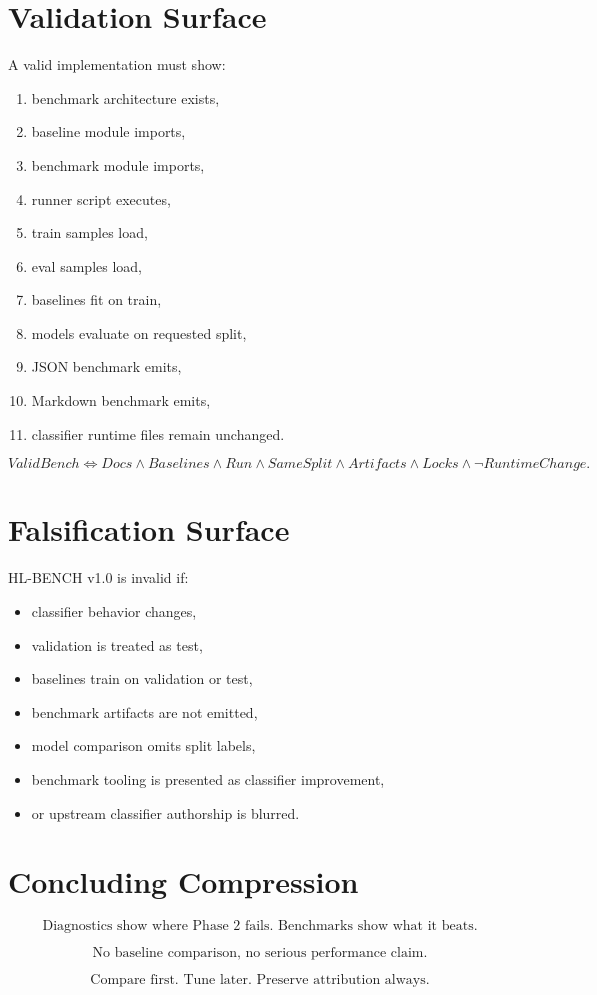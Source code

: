 \documentclass[12pt]{article}
\begin{document}
\section{Validation Surface}

A valid implementation must show:

\begin{enumerate}
\item benchmark architecture exists,
\item baseline module imports,
\item benchmark module imports,
\item runner script executes,
\item train samples load,
\item eval samples load,
\item baselines fit on train,
\item models evaluate on requested split,
\item JSON benchmark emits,
\item Markdown benchmark emits,
\item classifier runtime files remain unchanged.
\end{enumerate}

\[
\boxed{
ValidBench
\Longleftrightarrow
Docs
\wedge
Baselines
\wedge
Run
\wedge
SameSplit
\wedge
Artifacts
\wedge
Locks
\wedge
\neg RuntimeChange.
}
\]

\section{Falsification Surface}

HL-BENCH v1.0 is invalid if:

\begin{itemize}
\item classifier behavior changes,
\item validation is treated as test,
\item baselines train on validation or test,
\item benchmark artifacts are not emitted,
\item model comparison omits split labels,
\item benchmark tooling is presented as classifier improvement,
\item or upstream classifier authorship is blurred.
\end{itemize}

\section{Concluding Compression}

\[
\boxed{
\text{Diagnostics show where Phase 2 fails. Benchmarks show what it beats.}
}
\]

\[
\boxed{
\text{No baseline comparison, no serious performance claim.}
}
\]

\[
\boxed{
\text{Compare first. Tune later. Preserve attribution always.}
}
\]
\end{document}
